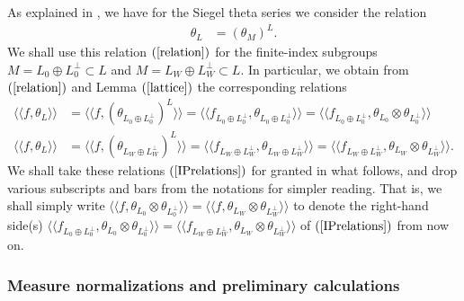 \documentclass{amsart}
\theoremstyle{definition}
\theoremstyle{definition}
\theoremstyle{definition}
\begin{document}
As explained in \cite[Remark 3.2]{BY}, we have for the Siegel theta series we consider the relation 
\begin{align}\label{relation} \theta_L &= (\theta_M)^L. \end{align}
We shall use this relation $(\ref{relation})$ for the finite-index subgroups $M = L_0 \oplus L_0^{\perp} \subset L$ and $M = L_W \oplus L_W^{\perp} \subset L$. 
In particular, we obtain from $(\ref{relation})$ and Lemma $(\ref{lattice})$ the corresponding relations 
\begin{equation}\begin{aligned}\label{IPrelations} 
\langle \langle f, \theta_L \rangle \rangle &= \langle \langle f, (\theta_{L_0 \oplus L_0^{\perp}})^L \rangle \rangle 
= \langle \langle f_{L_0 \oplus L_0^{\perp}}, \theta_{L_0 \oplus L_0^{\perp}} \rangle \rangle
= \langle \langle f_{L_0 \oplus L_0^{\perp}}, \theta_{L_0} \otimes \theta_{L_0^{\perp}} \rangle \rangle \\
\langle \langle f, \theta_L \rangle \rangle &= \langle \langle f, (\theta_{L_W \oplus L_W^{\perp}})^L \rangle \rangle 
= \langle \langle f_{L_W \oplus L_W^{\perp}}, \theta_{L_W \oplus L_W^{\perp}} \rangle \rangle
= \langle \langle f_{L_W \oplus L_W^{\perp}}, \theta_{L_W} \otimes \theta_{L_W^{\perp}} \rangle \rangle. \end{aligned}\end{equation}
We shall take these relations $(\ref{IPrelations})$ for granted in what follows, 
and drop various subscripts and bars from the notations for simpler reading. That is, we shall simply write 
$\langle \langle f, \theta_{L_0} \otimes \theta_{L_0^{\perp}} \rangle \rangle = \langle \langle f, \theta_{L_W} \otimes \theta_{L_W^{\perp}} \rangle \rangle$
to denote the right-hand side(s) $\langle \langle f_{L_0 \oplus L_0^{\perp}}, \theta_{L_0} \otimes \theta_{L_0^{\perp}} \rangle \rangle 
= \langle \langle f_{L_W \oplus L_W^{\perp}}, \theta_{L_W} \otimes \theta_{L_W^{\perp}} \rangle \rangle$ of $(\ref{IPrelations})$ from now on.  

\subsubsection{Measure normalizations and preliminary calculations}
\end{document}
